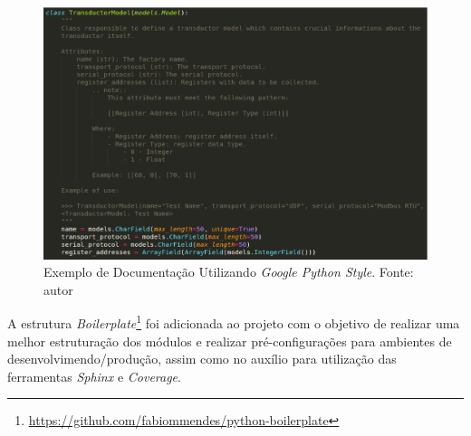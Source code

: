 \begin{figure}[!htpb]
    \centering
    \includegraphics[keepaspectratio=true,scale=0.5]{figuras/documentacao01.eps}
    \caption{Exemplo de Documentação Utilizando \textit{Google Python Style}. Fonte: autor}
    \label{documentacao01}
\end{figure}

A estrutura \textit{Boilerplate}\footnote{\url{https://github.com/fabiommendes/python-boilerplate}} foi adicionada ao projeto com o objetivo de realizar uma melhor estruturação dos módulos e realizar pré-configurações para ambientes de desenvolvimendo/produção, assim como no auxílio para utilização das ferramentas \textit{Sphinx} e \textit{Coverage}.

